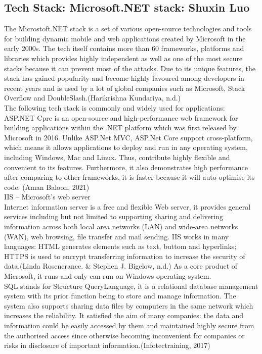 \documentclass[a4paper, 11pt]{report}
\begin{document}
\subsection{Tech Stack: Microsoft.NET stack: Shuxin Luo}
\noindent The Microstoft.NET stack is a set of various open-source technologies and tools for building dynamic mobile and web applications created by Microsoft in the early 2000s. The tech itself contains more than 60 frameworks, platforms and libraries which provides highly independent as well as one of the most secure stacks because it can prevent most of the attacks. Due to its unique features, the stack has gained popularity and become highly favoured among developers in recent years and is used by a lot of global companies such as Microsoft, Stack Overflow and DoubleSlash.(Harikrishna Kundariya, n.d.)\\

\noindent The following tech stack is commonly and widely used for applications:\\
 
\noindent ASP.NET Cpre is an open-source and high-performance web framework for building applications within the .NET platform which was first released by Microsoft in 2016. Unlike  ASP.Net MVC, ASP.Net Core support cross-platform, which means it allows applications to deploy and run in any operating system, including Windows, Mac and Linux. Thus, contribute highly flexible and convenient to its features. Furthermore, it also demonstrates high performance after comparing to other frameworks, it is faster because it will auto-optimise its code. (Aman Baloon, 2021)\\

\noindent IIS – Microsoft’s web server\\ 
\noindent Internet information server is a free and flexible Web server, it provides general services including but not limited to supporting sharing and delivering information across both local area networks (LAN) and wide-area networks (WAN), web browsing, file transfer and mail sending. IIS works in many languages: HTML generates elements such as text, buttom and hyperlinks; HTTPS is used to encrypt transferring information to increase the security of data.(Linda Rosencrance. \& Stephen J. Bigelow, n.d.)
As a core product of Microsoft, it runs and only can run on Windows operating system. \\


\noindent SQL stands for Structure QueryLanguage, it is a relational database management system with its prior function being to store and manage information. The system also supports sharing data files by computers in the same network which increases the reliability. It satisfied the aim of many companies: the data and information could be easily accessed by them and maintained highly secure from the authorised access since otherwise becoming inconvenient for companies or risks in disclosure of important information.(Infotectraining, 2017)\\
\end{document}

